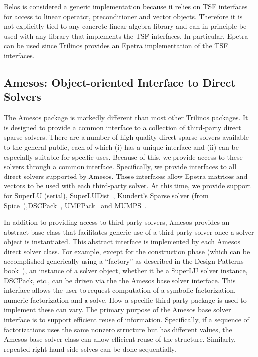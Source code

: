 \documentclass[acmtoms,acmnow]{acmtrans2m}
\begin{document}
Belos is considered a generic implementation because it relies on TSF
interfaces for access to linear operator, preconditioner and vector
objects.  Therefore it is not explicitly tied to any concrete linear
algebra library and can in principle be used with any library that
implements the TSF interfaces.  In particular, Epetra can be used
since Trilinos provides an Epetra implementation of the TSF
interfaces.

\subsection{Amesos: Object-oriented Interface to Direct Solvers}

The Amesos package is markedly different than most other Trilinos
packages.  It is designed to provide a common interface to a
collection of third-party direct sparse solvers.
There are a number of high-quality direct sparse
solvers available to the general public, each of which (i) has a unique
interface and (ii) can be especially suitable for specific uses.
Because of this, we provide access to these solvers through a common
interface.  Specifically, we provide interfaces to all direct solvers
supported by Amesos.  These interfaces allow Epetra matrices and
vectors to be used with each third-party solver.  At this time, we
provide support for SuperLU (serial), SuperLUDist~\cite{superlu-home-page}, 
Kundert's Sparse solver (from
Spice~\cite{spice-home-page}),DSCPack~\cite{dscpack-home-page}, UMFPack~\cite{umfpack-home-page}
and MUMPS~\cite{mumps-home-page}.

In addition to providing access to third-party solvers, Amesos
provides an abstract base class that facilitates generic use of a
third-party solver once a solver object is instantiated.  This
abstract interface is implemented by each Amesos direct solver class.
For example, except for the construction phase (which can be
accomplished generically using a ``factory'' as described in the
Design Patterns book~\cite{Gamma}), an instance of a solver object,
whether it be a SuperLU solver instance, DSCPack, etc., can be driven
via the the Amesos base solver interface.  This interface allows the
user to request computation of a symbolic factorization, numeric
factorization and a solve.  How a specific third-party package is used
to implement these can vary.  The primary purpose of the Amesos base
solver interface is to support efficient reuse of information.
Specifically, if a sequence of factorizations uses the same nonzero
structure but has different values, the Amesos base solver class can
allow efficient reuse of the structure.  Similarly, repeated
right-hand-side solves can be done sequentially.
\end{document}
